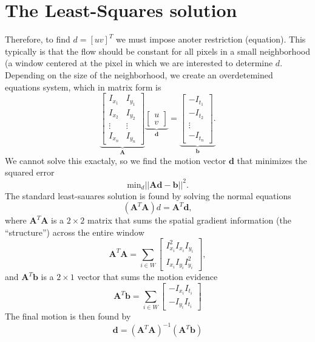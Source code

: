\section*{The Least-Squares solution}
Therefore, to find $d=[u v]^T$ we must impose anoter restriction
(equation). This typically is that the flow should be constant for all
pixels in a small neighborhood (a window centered at the pixel in which we are interested to determine $d$. Depending on the size of the neighborhood, we create an overdetemined equations system, which in matrix form is
\begin{equation}
  \underbrace{
\begin{bmatrix}
I_{x_1} & I_{y_1} \\
I_{x_2} & I_{y_2} \\
\vdots & \vdots \\
I_{x_n} & I_{y_n}
\end{bmatrix}
}_{\mathbf{A}}
\underbrace{
\begin{bmatrix}
u \\
v
\end{bmatrix}
}_{\mathbf{d}}
=
\underbrace{
\begin{bmatrix}
-I_{t_1} \\
-I_{t_2} \\
\vdots \\
-I_{t_n}
\end{bmatrix}.
}_{\mathbf{b}}
\end{equation}
We cannot solve this exactaly, so we find the motion vector $\mathbf{d}$ that minimizes the squared error
\begin{equation}
  \text{min}_d||\mathbf{A}\mathbf{d}-\mathbf{b}||^2.
\end{equation}
The standard least-sauares solution is found by solving the normal equations
\begin{equation}
  (\mathbf{A}^T\mathbf{A})d=\mathbf{A}^T\mathbf{d},
\end{equation}
where $\mathbf{A}^T\mathbf{A}$ is a $2\times 2$ matrix that sums the spatial gradient information (the ``structure'') across the entire window
\begin{equation}
  \mathbf{A}^T\mathbf{A} = \sum_{i\in W}
\begin{bmatrix}
I_{x_i}^2 I_{x_i}I_{y_i} \\
I_{x_i}I_{y_i} I_{y_i}^2
\end{bmatrix},
\end{equation}
and $\mathbf{A}^T\mathbf{b}$ is a $2\times 1$ vector that sums the motion evidence
\begin{equation}
  \mathbf{A}^T\mathbf{b} = \sum_{i\in W}
\begin{bmatrix}
-I_{x_i}I_{t_i} \\
-I_{y_i}I_{t_i}
\end{bmatrix}
\end{equation}
The final motion is then found by
\begin{equation}
  \mathbf{d} = (\mathbf{A}^T\mathbf{A})^{-1}(\mathbf{A}^T\mathbf{b})
\end{equation}

